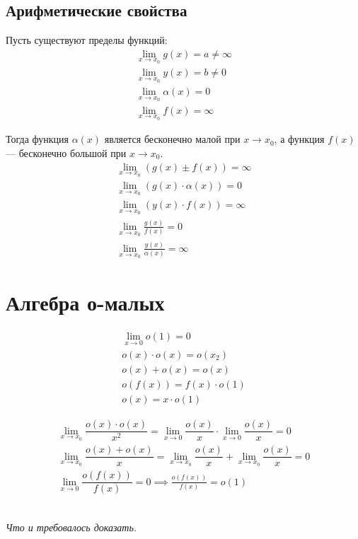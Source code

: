 \documentclass[a4paper,12pt,oneside]{extbook}
\newcommand{\newpar}{$ $\par\nobreak\ignorespaces}
\theoremstyle{numbered}
\theoremstyle{unnumbered}
\theoremstyle{named}
\theoremstyle{unnumbered}
\theoremstyle{named}
\theoremstyle{named}
\theoremstyle{named}
\renewenvironment{proof}[1][]{\breakenv[Доказательство]{\if\relax\detokenize{#1}\relax\else\;\fi}{\textbf{#1}}}{\smallskip\newpar \hfill\textit{Что и требовалось доказать.}}
\begin{document}
\subsection{Арифметические свойства}%
\label{sub:Арифметические свойства}

Пусть существуют пределы функций:
\begin{gather*}
    \lim_{x \to x_0}{g(x)} = a \neq \infty \\
    \lim_{x \to x_0}{y(x)} = b \neq 0 \\
    \lim_{x \to x_0}{\alpha(x)} = 0 \\
    \lim_{x \to x_0}{f(x)} = \infty
\end{gather*}

Тогда функция \(\alpha(x)\) является бесконечно малой при \(x \to x_0\), а функция \(f(x)\) — бесконечно большой при \(x \to x_0\).
\begin{gather*}
    \lim_{x \to x_0}{(g(x) \pm f(x))} = \infty \\
    \lim_{x \to x_0}{(g(x) \cdot \alpha(x))} = 0 \\
    \lim_{x \to x_0}{(y(x) \cdot f(x))} = \infty \\
    \lim_{x \to x_0}{\frac{g(x)}{f(x)}} = 0 \\
    \lim_{x \to x_0}{\frac{y(x)}{\alpha(x)}} = \infty
\end{gather*}

\section{Алгебра о-малых}%
\label{sec:Алгебра о-малых}

\begin{gather*}
    \lim_{x \to 0}{o(1)} = 0 \\
    o(x) \cdot o(x) = o(x_2) \\
    o(x) + o(x) = o(x) \\
    o(f(x)) = f(x) \cdot o(1) \\
    o(x) = x \cdot o(1)
\end{gather*}

\begin{proof}
    \begin{gather*}
        \lim_{x \to x_0}{\dfrac{o(x) \cdot o(x)}{x^2}} = \lim_{x \to 0}{\dfrac{o(x)}{x}} \cdot \lim_{x \to 0}{\dfrac{o(x)}{x}} = 0 \\
        \lim_{x \to x_0}{\dfrac{o(x) + o(x)}{x}} = \lim_{x \to x_0}{\dfrac{o(x)}{x}} + \lim_{x \to x_0}{\dfrac{o(x)}{x}} = 0 \\
        \lim_{x \to 0}{\dfrac{o(f(x))}{f(x)}} = 0 \implies \frac{o(f(x))}{f(x)} = o(1)
    \end{gather*}
\end{proof}
\end{document}
